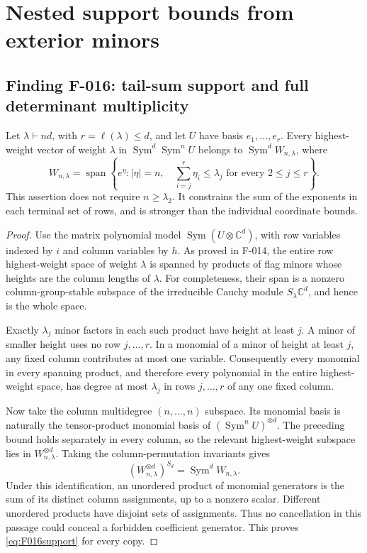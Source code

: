\section{Nested support bounds from exterior minors}

\subsection*{Finding F-016: tail-sum support and full determinant multiplicity}
Let \(\lambda\vdash nd\), with
\(r=\ell(\lambda)\leq d\), and let \(U\) have basis
\(e_1,\ldots,e_r\). Every highest-weight vector of weight
\(\lambda\) in \(\operatorname{Sym}^d\operatorname{Sym}^n U\)
belongs to \(\operatorname{Sym}^d W_{n,\lambda}\), where
\begin{equation}\label{eq:F016support}
 W_{n,\lambda}=
 \operatorname{span}\left\{e^\eta:|\eta|=n,\quad
             \sum_{i=j}^r\eta_i\leq\lambda_j
                             \text{ for every }2\leq j\leq r\right\}.
\end{equation}
This assertion does not require \(n\geq\lambda_2\).
It constrains the sum of the exponents in each terminal set
of rows, and is stronger than the individual coordinate bounds.

\begin{proof}
Use the matrix polynomial model
\(\operatorname{Sym}(U\otimes\mathbb C^d)\), with row
variables indexed by \(i\) and column variables by \(h\).
As proved in F-014, the entire row highest-weight space of
weight \(\lambda\) is spanned by products of flag minors
whose heights are the column lengths of \(\lambda\).
For completeness, their span is a nonzero column-group-stable
subspace of the irreducible Cauchy module
\(S_\lambda\mathbb C^d\), and hence is the whole space.

Exactly \(\lambda_j\) minor factors in each such product
have height at least \(j\). A minor of smaller height uses
no row \(j,\ldots,r\). In a monomial of a minor of height
at least \(j\), any fixed column contributes at most one
variable. Consequently every monomial in every spanning product,
and therefore every polynomial in the entire highest-weight
space, has degree at most \(\lambda_j\) in rows
\(j,\ldots,r\) of any one fixed column.

Now take the column multidegree \((n,\ldots,n)\) subspace.
Its monomial basis is naturally the tensor-product monomial
basis of \((\operatorname{Sym}^n U)^{\otimes d}\).
The preceding bound holds separately in every column, so
the relevant highest-weight subspace lies in
\(W_{n,\lambda}^{\otimes d}\). Taking the column-permutation
invariants gives
\[
       (W_{n,\lambda}^{\otimes d})^{S_d}
                                  =\operatorname{Sym}^d W_{n,\lambda}.
\]
Under this identification, an unordered product of monomial
generators is the sum of its distinct column assignments,
up to a nonzero scalar. Different unordered products have
disjoint sets of assignments. Thus no cancellation in this
passage could conceal a forbidden coefficient generator.
This proves \eqref{eq:F016support} for every copy.
\end{proof}

